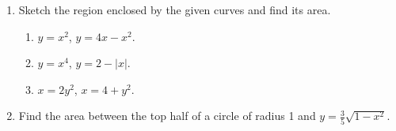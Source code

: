 \documentclass[12pt]{article}
\begin{document}
\begin{multicols*}{2}
\begin{enumerate}
		\item Sketch the region enclosed by the given curves and find its area.
		\begin{enumerate}
			\item $y = x^2$, $y = 4x-x^2$.
			\vfill
			\item $y = x^4$, $y = 2-|x|$.
			\vfill
			\item $x = 2y^2$, $x = 4+y^2$.
		\end{enumerate}
		\vfill
		\item Find the area between the top half of a circle of radius 1 and $y = \frac{3}{5}\sqrt{1-x^2}$.
		\vfill
	\end{enumerate}
\end{multicols*}
\end{document}
